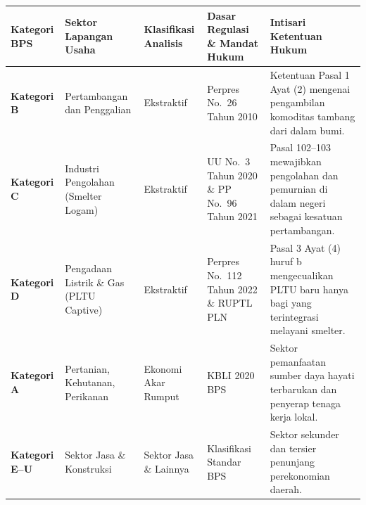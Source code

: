 \documentclass[
]{article}
\newcounter{none} %
\begin{document}
{\def\LTcaptype{none} %
\begin{longtable}[]{@{}
  >{\raggedright\arraybackslash}p{}
  >{\raggedright\arraybackslash}p{}
  >{\centering\arraybackslash}p{}
  >{\raggedright\arraybackslash}p{}
  >{\raggedright\arraybackslash}p{}@{}}
\toprule\noalign{}
\begin{minipage}[b]{\linewidth}\raggedright
Kategori BPS
\end{minipage} & \begin{minipage}[b]{\linewidth}\raggedright
Sektor Lapangan Usaha
\end{minipage} & \begin{minipage}[b]{\linewidth}\centering
Klasifikasi Analisis
\end{minipage} & \begin{minipage}[b]{\linewidth}\raggedright
Dasar Regulasi \& Mandat Hukum
\end{minipage} & \begin{minipage}[b]{\linewidth}\raggedright
Intisari Ketentuan Hukum
\end{minipage} \\
\midrule\noalign{}
\endhead
\bottomrule\noalign{}
\endlastfoot
\textbf{Kategori B} & Pertambangan dan Penggalian & Ekstraktif & Perpres
No.~26 Tahun 2010 & Ketentuan Pasal 1 Ayat (2) mengenai pengambilan
komoditas tambang dari dalam bumi. \\
\textbf{Kategori C} & Industri Pengolahan (Smelter Logam) & Ekstraktif &
UU No.~3 Tahun 2020 \& PP No.~96 Tahun 2021 & Pasal 102--103 mewajibkan
pengolahan dan pemurnian di dalam negeri sebagai kesatuan
pertambangan. \\
\textbf{Kategori D} & Pengadaan Listrik \& Gas (PLTU Captive) &
Ekstraktif & Perpres No.~112 Tahun 2022 \& RUPTL PLN & Pasal 3 Ayat (4)
huruf b mengecualikan PLTU baru hanya bagi yang terintegrasi melayani
smelter. \\
\textbf{Kategori A} & Pertanian, Kehutanan, Perikanan & Ekonomi Akar
Rumput & KBLI 2020 BPS & Sektor pemanfaatan sumber daya hayati
terbarukan dan penyerap tenaga kerja lokal. \\
\textbf{Kategori E--U} & 13 Sektor Jasa \& Konstruksi & Sektor Jasa \&
Lainnya & Klasifikasi Standar BPS & Sektor sekunder dan tersier
penunjang perekonomian daerah. \\
\end{longtable}
}
\end{document}
